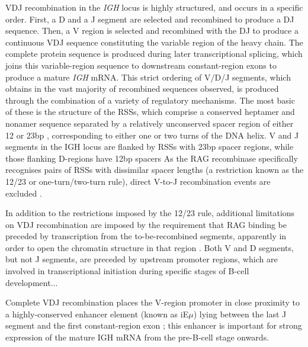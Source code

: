 VDJ recombination in the \textit{IGH} locus is highly structured, and occurs in a specific order. First, a D and a J segment are selected and recombined to produce a DJ sequence. Then, a V region is selected and recombined with the DJ to produce a continuous VDJ sequence constituting the variable region of the heavy chain. The complete protein sequence is produced during later transcriptional splicing, which joins this variable-region sequence to downstream constant-region exons to produce a mature \textit{IGH} mRNA. This strict ordering of V/D/J segments, which obtains in the vast majority of recombined sequences observed, is produced through the combination of a variety of regulatory mechanisms. The most basic of these is the structure of the RSSs, which comprise a conserved heptamer and nonamer sequence separated by a relatively unconserved spacer region of either 12 or 23bp \citep{jung2006vdjr}, corresponding to either one or two turns of the DNA helix. V and J segments in the IGH locus are flanked by RSSs with 23bp spacer regions, while those flanking D-regions have 12bp spacers %
As the RAG recombinase specifically recognises pairs of RSSs with dissimilar spacer lengths (a restriction known as the 12/23 or one-turn/two-turn rule), direct V-to-J recombination events are excluded \citep{jung2006vdjr}. %

In addition to the restrictions imposed by the 12/23 rule, additional limitations on VDJ recombination are imposed by the requirement that RAG binding be preceded by transcription from the to-be-recombined segments, apparently in order to open the chromatin structure in that region \citep{jung2006vdjr}. Both V and D segments, but not J segments, are preceded by upstream promoter regions, which are involved in transcriptional initiation during specific stages of B-cell development...

Complete VDJ recombination places the V-region promoter in close proximity to a highly-conserved enhancer element (known as iE$\mu$) lying between the last J segment and the first constant-region exon \citep{jung2006vdjr}; this enhancer is important for strong expression of the mature IGH mRNA from the pre-B-cell stage onwards. 

